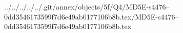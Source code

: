../../../../../.git/annex/objects/5f/Q4/MD5E-s4476--0dd3546173599f7d6e49ab0177106b8b.tex/MD5E-s4476--0dd3546173599f7d6e49ab0177106b8b.tex